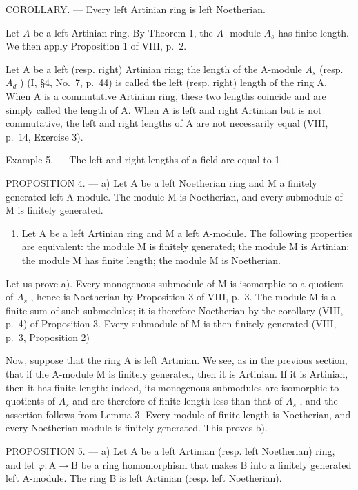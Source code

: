 COROLLARY. --- Every left Artinian ring is left Noetherian.

Let \(A\) be a left Artinian ring. By Theorem 1, the \(A\) -module \(A_s\) has finite length. We then apply Proposition 1 of VIII, p.~2.

Let A be a left (resp. right) Artinian ring; the length of the A-module \(A_{s}\) (resp. \(A_{d}\) ) (I, §4, No.~7, p.~44) is called the left (resp. right) length of the ring A. When A is a commutative Artinian ring, these two lengths coincide and are simply called the length of A. When A is left and right Artinian but is not commutative, the left and right lengths of A are not necessarily equal (VIII, p.~14, Exercise 3).

Example 5. --- The left and right lengths of a field are equal to 1.

PROPOSITION 4. --- a) Let A be a left Noetherian ring and M a finitely generated left A-module. The module M is Noetherian, and every submodule of M is finitely generated.

\begin{enumerate}
\def\labelenumi{\alph{enumi})}
\setcounter{enumi}{1}
\tightlist
\item
  Let A be a left Artinian ring and M a left A-module. The following properties are equivalent: the module M is finitely generated; the module M is Artinian; the module M has finite length; the module M is Noetherian.
\end{enumerate}

Let us prove a). Every monogenous submodule of M is isomorphic to a quotient of \(A_{s}\) , hence is Noetherian by Proposition 3 of VIII, p.~3. The module M is a finite sum of such submodules; it is therefore Noetherian by the corollary (VIII, p.~4) of Proposition 3. Every submodule of M is then finitely generated (VIII, p.~3, Proposition 2)

Now, suppose that the ring A is left Artinian. We see, as in the previous section, that if the A-module M is finitely generated, then it is Artinian. If it is Artinian, then it has finite length: indeed, its monogenous submodules are isomorphic to quotients of \(A_{s}\) and are therefore of finite length less than that of \(A_{s}\) , and the assertion follows from Lemma 3. Every module of finite length is Noetherian, and every Noetherian module is finitely generated. This proves b).

PROPOSITION 5. --- a) Let A be a left Artinian (resp. left Noetherian) ring, and let \(\varphi : \mathrm{A} \to \mathrm{B}\) be a ring homomorphism that makes B into a finitely generated left A-module. The ring B is left Artinian (resp. left Noetherian).

